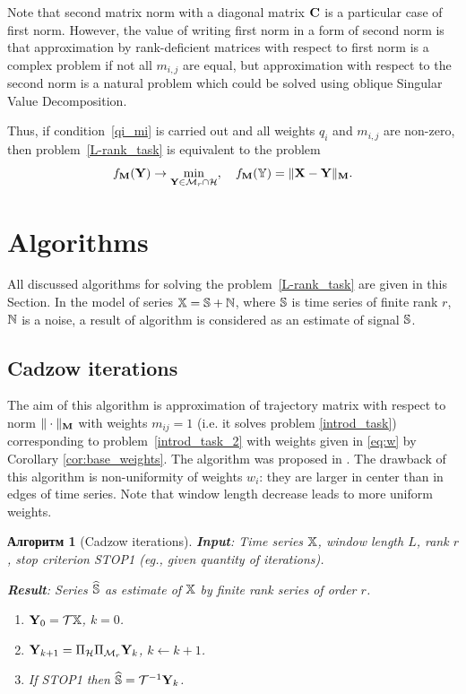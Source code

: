 \documentclass[12pt,a4paper,fleqn,leqno]{article}
\newtheorem{algorithm}{Алгоритм}
\begin{document}
Note that second matrix norm with a diagonal matrix $\mathbf{C}$ is a particular case of first norm. However, the value of writing first norm in a form of second norm is that approximation by rank-deficient matrices with respect to first norm is a complex problem if not all $m_{i,j}$ are equal, but approximation with respect to the second norm is a natural problem which could be solved using oblique Singular Value Decomposition.

\begin{remark}
\label{rem:2tasks}
Thus, if condition~\eqref{qi_mi} is carried out and all weights $q_i$ and $m_{i,j}$ are non-zero, then problem~\eqref{L-rank_task}
is equivalent to the problem
\begin{equation*}
\label{rank_task}
    f_{\mathbf{M}}(\mathbf{Y}) \to \min_{\mathbf{Y} \in \mathcal{M}_r \cap \mathcal{H}}, \quad f_{\mathbf{M}}(\mathbb{Y}) = \|\mathbf{X}-\mathbf{Y}\|_{\mathbf{M}}.
\end{equation*}
\end{remark}

\section{Algorithms}
\label{sec:alg}
All discussed algorithms for solving the problem~\eqref{L-rank_task} are given in this Section.
In the model of series $\mathbb{X}=\mathbb{S}+\mathbb{N}$, where $\mathbb{S}$ is time series of finite rank $r$, $\mathbb{N}$ is a noise, a result of algorithm is considered as an estimate of signal $\mathbb{S}$.

\subsection{Cadzow iterations}
The aim of this algorithm is approximation of trajectory matrix with respect to norm $\|\cdot\|_{\mathbf{M}}$ with weights $m_{ij}=1$ (i.e. it solves problem \eqref{introd_task}) corresponding to problem~\eqref{introd_task_2} with weights given in \eqref{eq:w} by Corollary \ref{cor:base_weights}. The algorithm was proposed in \cite{Cadzow1988}. The drawback of this algorithm is non-uniformity of weights $w_i$: they are larger in center than in edges of time series. Note that window length decrease leads to more uniform weights.
	
\begin{algorithm}[Cadzow iterations]
\textbf{Input}: Time series $\mathbb{X}$, window length $L$, rank $r$,
stop criterion STOP1 (eg., given quantity of iterations).

\textbf{Result}:
Series $\widehat{\mathbb{S}}$ as estimate of $\mathbb{X}$ by finite rank series of order $r$.

\begin{enumerate}
\item
$\mathbf{Y}_0 = \mathcal{T} \mathbb{X}$, $k=0$.
\item
$\mathbf{Y}_{k+1} = \Pi_{\mathcal{H}}  \Pi_{\mathcal{M}_r} \mathbf{Y}_{k}$, $k\leftarrow k+1$.
\item
If STOP1 then $\widehat{\mathbb{S}} = \mathcal{T}^{-1} \mathbf{Y}_k$.
\end{enumerate}
\end{algorithm}
\end{document}
